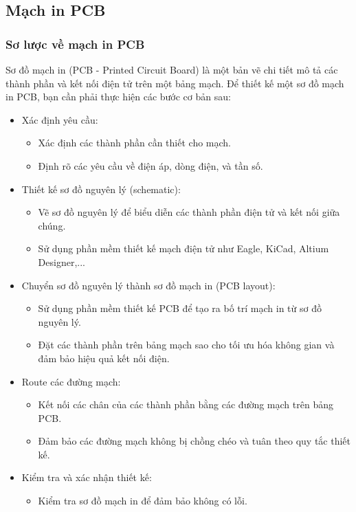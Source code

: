 \documentclass{article}
\begin{document}
\subsection{Mạch in PCB}
\subsubsection{Sơ lược về mạch in PCB}
Sơ đồ mạch in (PCB - Printed Circuit Board) là một bản vẽ chi tiết mô tả các
thành phần và kết nối điện tử trên một bảng mạch. Để thiết kế một sơ đồ mạch in PCB,
bạn cần phải thực hiện các bước cơ bản sau: 
\begin{itemize}
    \item Xác định yêu cầu:
    \begin{itemize}
        \item Xác định các thành phần cần thiết cho mạch.
        \item Định rõ các yêu cầu về điện áp, dòng điện, và tần số.
    \end{itemize}
    \item Thiết kế sơ đồ nguyên lý (schematic):
    \begin{itemize}
        \item Vẽ sơ đồ nguyên lý để biểu diễn các thành phần điện tử và kết nối giữa chúng.
        \item Sử dụng phần mềm thiết kế mạch điện tử như Eagle, KiCad, Altium Designer,...
    \end{itemize}
    \item Chuyển sơ đồ nguyên lý thành sơ đồ mạch in (PCB layout):
    \begin{itemize}
        \item Sử dụng phần mềm thiết kế PCB để tạo ra bố trí mạch in từ sơ đồ nguyên lý.
        \item Đặt các thành phần trên bảng mạch sao cho tối ưu hóa không gian và đảm bảo hiệu quả kết nối điện.
    \end{itemize}
    \item Route các đường mạch:
    \begin{itemize}
        \item Kết nối các chân của các thành phần bằng các đường mạch trên bảng PCB.
        \item Đảm bảo các đường mạch không bị chồng chéo và tuân theo quy tắc thiết kế.
    \end{itemize}
    \item Kiểm tra và xác nhận thiết kế:
    \begin{itemize}
        \item Kiểm tra sơ đồ mạch in để đảm bảo không có lỗi.

\end{itemize}
\end{itemize}
\end{document}
